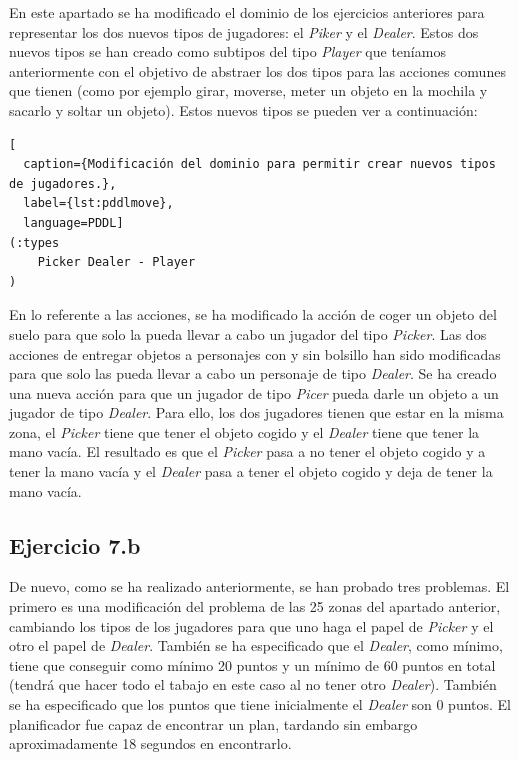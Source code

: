 \documentclass[11pt,a4paper]{article}
\begin{document}
En este apartado se ha modificado el dominio de los ejercicios anteriores para representar los dos nuevos tipos de jugadores: el
\textit{Piker} y el \textit{Dealer}. Estos dos nuevos tipos se han creado como subtipos del tipo \textit{Player} que teníamos
anteriormente con el objetivo de abstraer los dos tipos para las acciones comunes que tienen (como por ejemplo girar, moverse, meter
un objeto en la mochila y sacarlo y soltar un objeto). Estos nuevos tipos se pueden ver a continuación:

\begin{algorithm}[H]
\begin{lstlisting}[
  caption={Modificación del dominio para permitir crear nuevos tipos de jugadores.},
  label={lst:pddlmove},
  language=PDDL]
(:types
	Picker Dealer - Player
)
\end{lstlisting}
\end{algorithm}

En lo referente a las acciones, se ha modificado la acción de coger un objeto del suelo para que solo la pueda llevar a cabo un
jugador del tipo \textit{Picker}. Las dos acciones de entregar objetos a personajes con y sin bolsillo han sido modificadas para que
solo las pueda llevar a cabo un personaje de tipo \textit{Dealer}. Se ha creado una nueva acción para que un jugador de tipo
\textit{Picer} pueda darle un objeto a un jugador de tipo \textit{Dealer}. Para ello, los dos jugadores tienen que estar en la misma
zona, el \textit{Picker} tiene que tener el objeto cogido y el \textit{Dealer} tiene que tener la mano vacía. El resultado es que
el \textit{Picker} pasa a no tener el objeto cogido y a tener la mano vacía y el \textit{Dealer} pasa a tener el objeto cogido y
deja de tener la mano vacía.

\subsection{Ejercicio 7.b}

De nuevo, como se ha realizado anteriormente, se han probado tres problemas. El primero es una modificación del problema de las 25
zonas del apartado anterior, cambiando los tipos de los jugadores para que uno haga el papel de \textit{Picker} y el otro el papel
de \textit{Dealer}. También se ha especificado que el \textit{Dealer}, como mínimo, tiene que conseguir como mínimo 20 puntos y
un mínimo de 60 puntos en total (tendrá que hacer todo el tabajo en este caso al no tener otro \textit{Dealer}). 
También se ha especificado que los puntos que tiene inicialmente el \textit{Dealer} son 0 puntos.
El planificador fue capaz de encontrar un plan, tardando sin embargo aproximadamente 18 segundos en encontrarlo.
\end{document}
